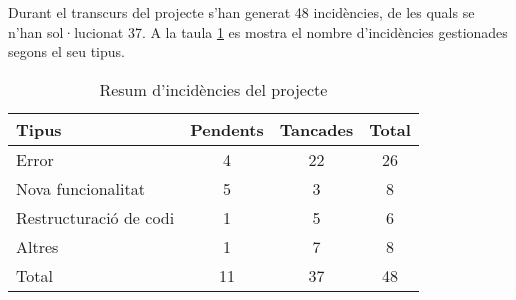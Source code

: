 Durant el transcurs del projecte s'han generat 48 incidències, de les quals se n'han sol·lucionat 37. A la taula \ref{t:resum-incidencies} es mostra el nombre d'incidències gestionades segons el seu tipus.

\begin{table}[htbp]\begin{center}\begin{tabular}{|l|c|c|c|}
\hline
\textbf{Tipus} & \textbf{Pendents} & \textbf{Tancades} & \textbf{Total} \\ \hline
Error & 4 & 22 & 26 \\ \hline
Nova  funcionalitat & 5 & 3 & 8 \\ \hline
Restructuració de codi & 1 & 5 & 6 \\ \hline
Altres & 1 & 7 & 8 \\ \hline
Total & 11 & 37 & 48 \\ \hline
\end{tabular}\end{center}
\caption{Resum d'incidències del projecte}\label{t:resum-incidencies}
\end{table} 

